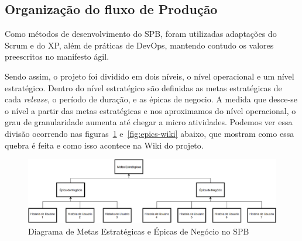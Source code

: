 \subsection{Organização do fluxo de Produção}
\label{est:sof:org}



Como métodos de desenvolvimento do SPB, foram utilizadas adaptações do Scrum e do XP, além de práticas de DevOps, mantendo contudo os valores preescritos no manifesto ágil. 



Sendo assim, o projeto foi dividido em dois níveis,
o nível operacional e um nível estratégico. Dentro do nível estratégico são definidas
as metas estratégicas de cada \textit{release}, o período de duração, e as épicas
de negocio. A medida que desce-se o nível a partir das metas estratégicas e nos
aproximamos do nível operacional, o grau de granularidade aumenta até chegar a
micro atividades. Podemos ver essa divisão ocorrendo nas figuras~\ref{fig:epics-diagram} 
e~\ref{fig:epics-wiki} abaixo, que mostram como essa quebra é feita e como isso acontece 
na Wiki do projeto. 

\newpage
\begin{figure}[h]
    \centering
        \includegraphics[keepaspectratio=true,scale=0.3]{figuras/epics-diagram.eps}
    \caption{Diagrama de Metas Estratégicas e Épicas de Negócio no SPB}
    \label{fig:epics-diagram}
\end{figure}

